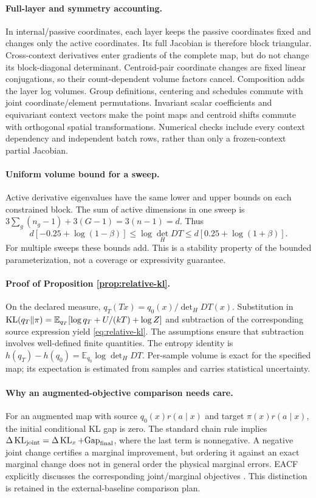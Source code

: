 \paragraph{Full-layer and symmetry accounting.}
In internal/passive coordinates, each layer keeps the passive coordinates
fixed and changes only the active coordinates. Its full Jacobian is therefore
block triangular. Cross-context derivatives enter gradients of the complete
map, but do not change its block-diagonal determinant. Centroid-pair coordinate
changes are fixed linear conjugations, so their count-dependent volume factors
cancel. Composition adds the layer log volumes. Group definitions, centering
and schedules commute with joint coordinate/element permutations. Invariant
scalar coefficients and equivariant context vectors make the point maps and
centroid shifts commute with orthogonal spatial transformations. Numerical
checks include every context dependency and independent batch rows, rather
than only a frozen-context partial Jacobian.

\paragraph{Uniform volume bound for a sweep.}
Active derivative eigenvalues have the same lower and upper bounds on each
constrained block. The sum of active dimensions in one sweep is
$3\sum_g(n_g-1)+3(G-1)=3(n-1)=d$. Thus
\[
 d[-0.25+\log(1-\beta)]\leq\log\det_HDT
 \leq d[0.25+\log(1+\beta)].
\]
For multiple sweeps these bounds add. This is a stability property of the
bounded parameterization, not a coverage or expressivity guarantee.

\paragraph{Proof of Proposition \ref{prop:relative-kl}.}
On the declared measure, $q_T(Tx)=q_0(x)/\det_HDT(x)$. Substitution in
$\operatorname{KL}(q_T\Vert\pi)=\mathbb E_{q_T}[\log q_T+U/(kT)+\log Z]$ and subtraction
of the corresponding source expression yield \eqref{eq:relative-kl}.
The assumptions ensure that subtraction involves well-defined finite
quantities. The entropy identity is
$h(q_T)-h(q_0)=\mathbb E_{q_0}\log\det_HDT$.
Per-sample volume is exact for the specified map; its expectation is estimated
from samples and carries statistical uncertainty.

\paragraph{Why an augmented-objective comparison needs care.}
For an augmented map with source $q_0(x)r(a\mid x)$ and target
$\pi(x)r(a\mid x)$, the initial conditional KL gap is zero. The standard
chain rule implies $\Delta\operatorname{KL}_{\rm joint}=\Delta\operatorname{KL}_x+\mathrm{Gap}_{\rm final}$,
where the last term is nonnegative. A negative joint change certifies a
marginal improvement, but ordering it against an exact marginal change does
not in general order the physical marginal errors. EACF explicitly discusses
the corresponding joint/marginal objectives \citep{midgley2023eacf}.
This distinction is retained in the external-baseline comparison plan.

